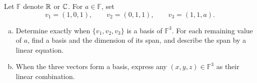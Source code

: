 \begin{exercise}
  \label{ex:hw01:parameter-dependent-span}
  Let \(\mathbb F\) denote \(\mathbb{R}\) or \(\mathbb{C}\). For \(a\in\mathbb F\), set
  \[
    v_1=(1,0,1),\qquad v_2=(0,1,1),\qquad v_3=(1,1,a).
  \]
  \begin{enumerate}[(a)][2]
    \item Determine exactly when \(\{v_1,v_2,v_3\}\) is a basis of
      \(\mathbb F^3\). For each remaining value of \(a\), find a basis
      and the dimension of its span, and describe the span by a linear equation.
    \item When the three vectors form a basis, express any
      \((x,y,z)\in\mathbb F^3\) as their linear combination.
  \end{enumerate}
\end{exercise}

